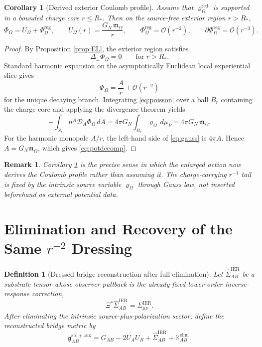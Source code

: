 \documentclass[11pt]{article}
\newcommand{\BridgeMetric}{\mathfrak g}
\newcommand{\ObserverMap}{\Xi}
\newcommand{\SpatialD}{\mathcal D}
\newcommand{\LapPerp}{\Delta_\perp}
\newcommand{\FlowPot}{\Phi_\Omega}
\newcommand{\FlowPotReg}{\Phi_\Omega^{\mathrm{reg}}}
\newcommand{\CoulPot}{U_\Omega}
\newcommand{\SourceDensity}{\varrho_\Omega}
\newcommand{\SourceDensityRed}{\varrho_\Omega^{\mathrm{red}}}
\newcommand{\HamChargeOmega}{\mathfrak m_\Omega}
\newcommand{\SigmaIER}{\Sigma^{\mathrm{IER}}}
\newcommand{\LiftIER}{\widehat\Sigma^{\mathrm{IER}}}
\newcommand{\AuxPol}{\mathbb K}
\newtheorem{definition}{Definition}
\newtheorem{remark}{Remark}
\newtheorem{corollary}{Corollary}
\begin{document}
\begin{corollary}[Derived exterior Coulomb profile]
\label{cor:coulomb}
Assume that \(\SourceDensityRed\) is supported in a bounded charge core \(r\le R_\ast\). Then on the source-free exterior region \(r>R_\ast\),
\begin{equation}
\FlowPot
=
\CoulPot+\FlowPotReg,
\qquad
\CoulPot(r)=\frac{G_N\,\HamChargeOmega}{r},
\qquad
\FlowPotReg=\mathcal O(r^{-2}),
\qquad
\partial\FlowPotReg=\mathcal O(r^{-3}).
\label{eq:potdecomp}
\end{equation}
\end{corollary}

\begin{proof}
By Proposition \ref{prop:EL}, the exterior region satisfies
\[
\LapPerp\FlowPot=0
\qquad
\text{for } r>R_\ast.
\]
Standard harmonic expansion on the asymptotically Euclidean local experiential slice gives
\[
\FlowPot=\frac{A}{r}+\mathcal O(r^{-2})
\]
for the unique decaying branch. Integrating \eqref{eq:poisson} over a ball \(B_r\) containing the charge core and applying the divergence theorem yields
\begin{equation}
-\int_{S_r} n^A\SpatialD_A\FlowPot\,dA
=
4\pi G_N\int_{B_r}\SourceDensity\,d\mu_P
=
4\pi G_N\,\HamChargeOmega.
\label{eq:gauss}
\end{equation}
For the harmonic monopole \(A/r\), the left-hand side of \eqref{eq:gauss} is \(4\pi A\). Hence \(A=G_N\HamChargeOmega\), which gives \eqref{eq:potdecomp}.
\end{proof}

\begin{remark}
Corollary \ref{cor:coulomb} is the precise sense in which the enlarged action now derives the Coulomb profile rather than assuming it. The charge-carrying \(r^{-1}\) tail is fixed by the intrinsic source variable \(\SourceDensity\) through Gauss law, not inserted beforehand as external potential data.
\end{remark}

\section{Elimination and Recovery of the Same \(r^{-2}\) Dressing}

\begin{definition}[Dressed bridge reconstruction after full elimination]
\label{def:bridge}
Let \(\LiftIER_{AB}\) be a substrate tensor whose observer pullback is the already-fixed lower-order inverse-response correction,
\begin{equation}
\ObserverMap^\ast\LiftIER_{AB}=\SigmaIER_{\mu\nu}.
\label{eq:liftier}
\end{equation}
After eliminating the intrinsic source-plus-polarization sector, define the reconstructed bridge metric by
\begin{equation}
\BridgeMetric_{AB}^{\mathrm{src+aux}}
=
G_{AB}
-2U_AU_B
+\LiftIER_{AB}
+\AuxPol_{AB}^{\mathrm{elim}}.
\label{eq:bridge}
\end{equation}
\end{definition}
\end{document}

